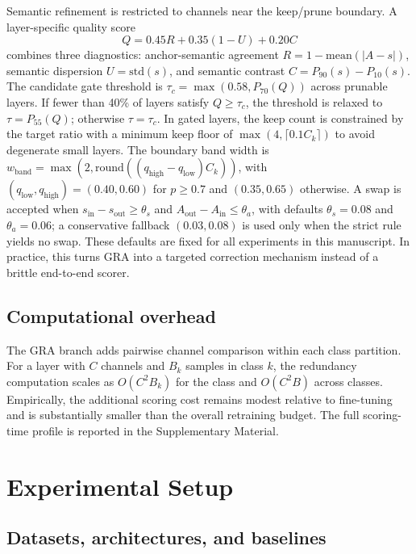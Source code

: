\documentclass[preprint,12pt]{elsarticle}
\begin{document}
Semantic refinement is restricted to channels near the keep/prune boundary. A layer-specific quality score
\begin{equation}
Q=0.45R+0.35(1-U)+0.20C
\label{eq:ivc_quality}
\end{equation}
combines three diagnostics: anchor-semantic agreement $R = 1 - \mathrm{mean}(|A-s|)$, semantic dispersion $U = \mathrm{std}(s)$, and semantic contrast $C = P_{90}(s) - P_{10}(s)$. The candidate gate threshold is $\tau_c=\max(0.58, P_{70}(Q))$ across prunable layers. If fewer than 40\% of layers satisfy $Q \geq \tau_c$, the threshold is relaxed to $\tau=P_{55}(Q)$; otherwise $\tau=\tau_c$. In gated layers, the keep count is constrained by the target ratio with a minimum keep floor of $\max(4,\lceil 0.1C_k\rceil)$ to avoid degenerate small layers. The boundary band width is $w_{\mathrm{band}}=\max(2,\mathrm{round}((q_{\mathrm{high}}-q_{\mathrm{low}})C_k))$, with $(q_{\mathrm{low}},q_{\mathrm{high}})=(0.40,0.60)$ for $p\geq0.7$ and $(0.35,0.65)$ otherwise. A swap is accepted when $s_{\mathrm{in}}-s_{\mathrm{out}}\geq \theta_s$ and $A_{\mathrm{out}}-A_{\mathrm{in}}\leq \theta_a$, with defaults $\theta_s=0.08$ and $\theta_a=0.06$; a conservative fallback $(0.03,0.08)$ is used only when the strict rule yields no swap. These defaults are fixed for all experiments in this manuscript. In practice, this turns GRA into a targeted correction mechanism instead of a brittle end-to-end scorer.

\subsection{Computational overhead}

The GRA branch adds pairwise channel comparison within each class partition. For a layer with $C$ channels and $B_k$ samples in class $k$, the redundancy computation scales as $O(C^2B_k)$ for the class and $O(C^2B)$ across classes. Empirically, the additional scoring cost remains modest relative to fine-tuning and is substantially smaller than the overall retraining budget. The full scoring-time profile is reported in the Supplementary Material.

\section{Experimental Setup}
\label{sec:experimental_setup}

\subsection{Datasets, architectures, and baselines}
\end{document}
